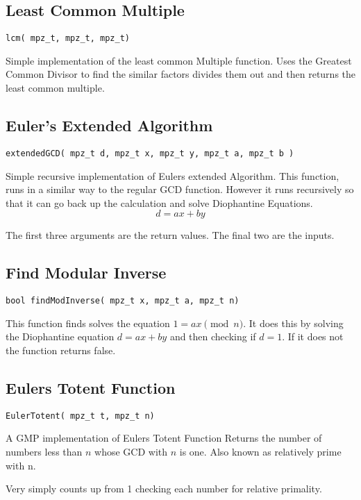 \subsection{Least Common Multiple }
\begin{verbatim}
lcm( mpz_t, mpz_t, mpz_t)
\end{verbatim}
Simple implementation of the least common Multiple function.
Uses the Greatest Common Divisor to find the similar factors divides them out and then returns the least common multiple.

\subsection{Euler's Extended Algorithm}
\begin{verbatim}
extendedGCD( mpz_t d, mpz_t x, mpz_t y, mpz_t a, mpz_t b )
\end{verbatim}
Simple recursive implementation of Eulers extended Algorithm.
This function, runs in a similar way to the regular GCD function. 
However it runs recursively so that it can go back up the calculation and solve Diophantine Equations.
$$d = ax + by$$

The first three arguments are the return values. The final two are the inputs.


\subsection{Find Modular Inverse}
\begin{verbatim}
bool findModInverse( mpz_t x, mpz_t a, mpz_t n)
\end{verbatim}
This function finds solves the equation $1 = ax \pmod n$. 
It does this  by solving the Diophantine equation $d = ax + by$ and then checking if $d = 1$. 
If it does not the function returns false.

\subsection{Eulers Totent Function}
\begin{verbatim}
EulerTotent( mpz_t t, mpz_t n)
\end{verbatim}

A GMP implementation of Eulers Totent Function
Returns the number of numbers less than $n$ whose GCD with $n$ is one. 
Also known as relatively prime with n.

Very simply counts up from 1 checking each number for relative primality.


